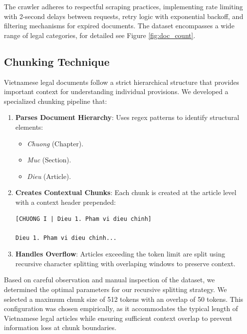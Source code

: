 \documentclass[letterpaper]{article} %
\begin{document}
The crawler adheres to respectful scraping practices, implementing rate limiting with 2-second delays between requests, retry logic with exponential backoff, and filtering mechanisms for expired documents. The dataset encompasses a wide range of legal categories, for detailed see Figure \ref{fig:doc_count}.

\subsection{Chunking Technique} \label{sec:chunking}

Vietnamese legal documents follow a strict hierarchical structure that provides important context for understanding individual provisions. We developed a specialized chunking pipeline that:

\begin{enumerate}
	\item \textbf{Parses Document Hierarchy}: Uses regex patterns to identify structural elements:
	      \begin{itemize}
		      \item \textit{Chuong} (Chapter).
		      \item \textit{Muc} (Section).
		      \item \textit{Dieu} (Article).
	      \end{itemize}

	\item \textbf{Creates Contextual Chunks}: Each chunk is created at the article level with a context header prepended:
	      \begin{verbatim}
[CHUONG I | Dieu 1. Pham vi dieu chinh]

Dieu 1. Pham vi dieu chinh...
    \end{verbatim}

	\item \textbf{Handles Overflow}: Articles exceeding the token limit are split using recursive character splitting with overlaping windows to preserve context.
\end{enumerate}

Based on careful observation and manual inspection of the dataset, we determined the optimal parameters for our recursive splitting strategy. We selected a maximum chunk size of 512 tokens with an overlap of 50 tokens. This configuration was chosen empirically, as it accommodates the typical length of Vietnamese legal articles while ensuring sufficient context overlap to prevent information loss at chunk boundaries.
\end{document}

